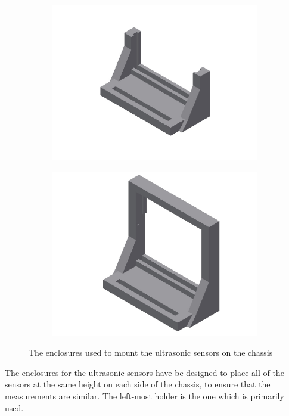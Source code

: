 \begin{figure}[H]
	\centering
	\begin{subfigure}[]{0.4\textwidth}
		\includegraphics[width=\textwidth]{images/ultrasonicholder.jpg}
	\end{subfigure}%
	\quad
	\begin{subfigure}[]{0.4\textwidth}
		\includegraphics[width=\textwidth]{images/ultrasonicholder-upsidedown.jpg}
	\end{subfigure}
	\caption{The enclosures used to mount the ultrasonic sensors on the chassis}
\end{figure}

The enclosures for the ultrasonic sensors have be designed to place all of the sensors at the same height on each side of the chassis, to ensure that the measurements are similar. The left-most holder is the one which is primarily used.

